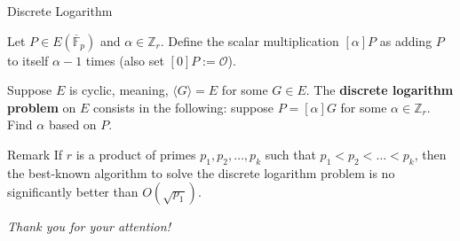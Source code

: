 \documentclass{beamer}
\begin{document}
    \begin{frame}{Discrete Logarithm}
        \begin{definition}
           
            Let $P \in E(\overline{\mathbb{F}}_p)$ and $\alpha \in \mathbb{Z}_r$. Define the scalar multiplication $[\alpha]P$ as adding $P$ to itself $\alpha-1$ times (also set $[0]P := \mathcal{O}$).\pause
            
        \end{definition}

        \begin{definition}
            Suppose $E$ is cyclic, meaning, $\langle G \rangle = E$ for some $G \in E$. The \textbf{discrete logarithm problem} on $E$ consists in the following: suppose $P = [\alpha]G$ for some $\alpha \in \mathbb{Z}_r$. Find $\alpha$ based on $P$.\pause
        \end{definition}

        \begin{block}{Remark}
            If $r$ is a product of primes $p_1,p_2,\dots,p_k$ such that $p_1<p_2<\dots< p_k$, then the best-known algorithm to solve the discrete logarithm problem is no significantly better than $O(\sqrt{p_1})$.
        \end{block}
    \end{frame}

    \begin{frame}{}
        \centering \Large
        \emph{Thank you for your attention!}
      \end{frame}
\end{document}
